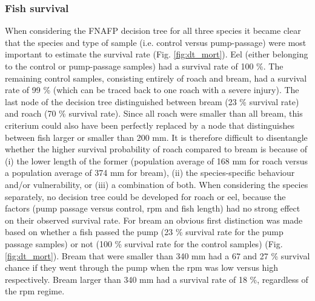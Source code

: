 \documentclass[fleqn,10pt]{wlscirep}
\begin{document}
\subsubsection*{Fish survival}
When considering the FNAFP decision tree for all three species it became clear that the species and type of sample (i.e. control versus pump-passage) were most important to estimate the survival rate (Fig. \ref{fig:dt_mort}). Eel (either belonging to the control or pump-passage samples) had a survival rate of 100 \%. The remaining control samples, consisting entirely of roach and bream, had a survival rate of 99 \% (which can be traced back to one roach with a severe injury). The last node of the decision tree distinguished between bream (23 \% survival rate) and roach (70 \% survival rate). Since all roach were smaller than all bream, this criterium could also have been perfectly replaced by a node that distinguishes between fish larger or smaller than 200 mm. It is therefore difficult to disentangle whether the higher survival probability of roach compared to bream is because of (i) the lower length of the former (population average of 168 mm for roach versus a population average of 374 mm for bream), (ii) the species-specific behaviour and/or vulnerability, or (iii) a combination of both. When considering the species separately, no decision tree could be developed for roach or eel, because the factors (pump passage versus control, rpm and fish length) had no strong effect on their observed survival rate. For bream an obvious first distinction was made based on whether a fish passed the pump (23 \% survival rate for the pump passage samples) or not (100 \% survival rate for the control samples) (Fig. \ref{fig:dt_mort}). Bream that were smaller than 340 mm had a 67 and 27 \% survival chance if they went through the pump when the rpm was low versus high respectively. Bream larger than 340 mm had a survival rate of 18 \%, regardless of the rpm regime. 
\end{document}
